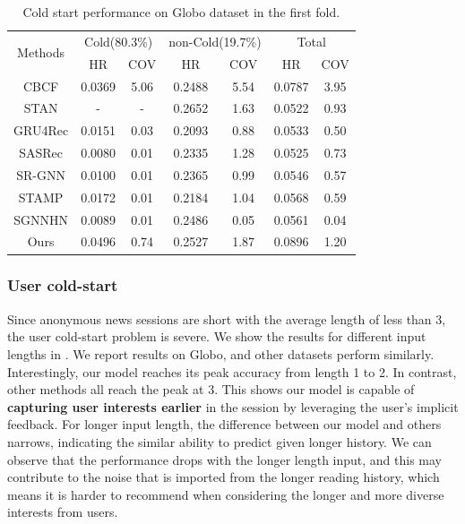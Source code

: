 \begin{table}[!htp]
\caption{Cold start performance on Globo dataset in the first fold.}
\label{tb:cold-start}
\centering
\renewcommand{\arraystretch}{1.3}
\begin{tabular}{|c|c|c|c|c|c|c|}
  \hline
  \multirow{2}{*}{Methods}  & \multicolumn{2}{c|}{Cold(80.3\%)} & \multicolumn{2}{c|}{non-Cold(19.7\%)} & \multicolumn{2}{c|}{Total} \\ \cline{2-7} 
    & HR & COV & HR & COV & HR & COV   \\ 
  \hline
  CBCF & 0.0369   & 5.06  &  0.2488 & 5.54 & 0.0787  & 3.95 \\
  STAN & -  & - &  0.2652  &  1.63 & 0.0522   & 0.93  \\ 
  \hline
  GRU4Rec & 0.0151  & 0.03  & 0.2093 & 0.88 &  0.0533  & 0.50 \\
  SASRec & 0.0080  & 0.01  & 0.2335 & 1.28 & 0.0525 & 0.73 \\
  SR-GNN & 0.0100  & 0.01  & 0.2365 & 0.99  & 0.0546 & 0.57\\ 
  STAMP & 0.0172 & 0.01 & 0.2184  & 1.04 & 0.0568 & 0.59 \\
  SGNNHN & 0.0089 & 0.01 & 0.2486 & 0.05 & 0.0561 & 0.04 \\
  \hline
  Ours & 0.0496 & 0.74 & 0.2527  & 1.87  & 0.0896  & 1.20  \\
  \hline
\end{tabular}
\end{table}

\subsubsection{User cold-start}
\label{sec:usercold}
Since anonymous news sessions are short with the average length of less than 3, 
the user cold-start problem is severe. We show the results for different input lengths in 
. We report results on Globo, and other datasets perform similarly. Interestingly, our model reaches its peak accuracy from length 1 to 2. 
In contrast, other methods all reach the peak at 3.
This shows our model is capable of \textbf{capturing user interests earlier} in the session 
by leveraging the user's implicit feedback. For longer input length, 
the difference between our model and others narrows, 
indicating the similar ability to predict given longer history. We can observe that the performance drops with the longer length input, and this may contribute to the noise that is imported from the longer reading history, which means it is harder to recommend when considering the longer and more diverse interests from users.


